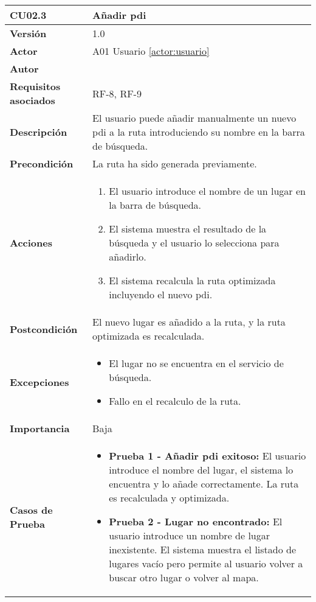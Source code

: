 \begin{table}[H]
	\centering
	\begin{tabularx}{\linewidth}{ p{} p{} }
		\toprule
		\textbf{CU02.3}    & \textbf{Añadir \acrfull{pdi}} \\
		\toprule
		\textbf{Versión}              & 1.0    \\
		\textbf{Actor}                & A01 Usuario \ref{actor:usuario} \\
		\textbf{Autor}                & \autor \\
		\textbf{Requisitos asociados} & RF-8, RF-9 \\
		\textbf{Descripción}          & El usuario puede añadir manualmente un nuevo \acrshort{pdi} a la ruta introduciendo su nombre en la barra de búsqueda. \\
		\textbf{Precondición}         & La ruta ha sido generada previamente. \\
		\textbf{Acciones}             &
		\begin{enumerate}
			\def\labelenumi{\arabic{enumi}.}
			\tightlist
			\item El usuario introduce el nombre de un lugar en la barra de búsqueda.
			\item El sistema muestra el resultado de la búsqueda y el usuario lo selecciona para añadirlo.
			\item El sistema recalcula la ruta optimizada incluyendo el nuevo \acrlong{pdi}.
		\end{enumerate}\\
		\textbf{Postcondición}        & El nuevo lugar es añadido a la ruta, y la ruta optimizada es recalculada. \\
		\textbf{Excepciones}          & 
		\begin{itemize}
			\tightlist
			\item El lugar no se encuentra en el servicio de búsqueda.
			\item Fallo en el recalculo de la ruta.
		\end{itemize}\\
		\textbf{Importancia}          & Baja \\
		\textbf{Casos de Prueba}      &
		\begin{itemize}
			\item \textbf{Prueba 1 - Añadir \acrshort{pdi} exitoso:} El usuario introduce el nombre del lugar, el sistema lo encuentra y lo añade correctamente. La ruta es recalculada y optimizada.
			\vspace{2pt}
			\item \textbf{Prueba 2 - Lugar no encontrado:} El usuario introduce un nombre de lugar inexistente. El sistema muestra el listado de lugares vacío pero permite al usuario volver a buscar otro lugar o volver al mapa.

\end{itemize}
\end{tabularx}
\end{table}
